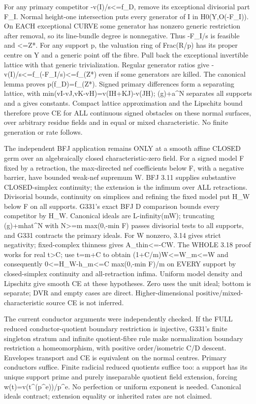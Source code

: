 \documentclass[11pt]{article}
\begin{document}
For any primary competitor -v(I)/s\textless{}=f\_D, remove its exceptional divisorial part F\_I. Normal height-one intersection puts every generator of I in H0(Y,O(-F\_I)). On EACH exceptional CURVE some generator has nonzero generic restriction after removal, so its line-bundle degree is nonnegative. Thus -F\_I/s is feasible and \textless{}=Z*. For any support p, the valuation ring of Frac(R/p) has its proper centre on Y and a generic point off the fibre. Pull back the exceptional invertible lattice with that generic trivialization. Regular generator ratios give -v(I)/s\textless{}=f\_(-F\_I/s)\textless{}=f\_(Z*) even if some generators are killed. The canonical lemma proves p(f\_D)=f\_(Z*). Signed primary differences form a separating lattice, with min(vI-vJ,vK-vH)=v(IH+KJ)-v(JH); (g)+a\textasciicircum{}N separates all supports and a gives constants. Compact lattice approximation and the Lipschitz bound therefore prove CE for ALL continuous signed obstacles on these normal surfaces, over arbitrary residue fields and in equal or mixed characteristic. No finite generation or rate follows.

The independent BFJ application remains ONLY at a smooth affine CLOSED germ over an algebraically closed characteristic-zero field. For a signed model F fixed by a retraction, the max-directed nef coefficients below F, with a negative barrier, have bounded weak-nef supremum W. BFJ 3.11 supplies substantive CLOSED-simplex continuity; the extension is the infimum over ALL retractions. Divisorial bounds, continuity on simplices and refining the fixed model put H\_W below F on all supports. G331's exact BFJ D comparison bounds every competitor by H\_W. Canonical ideals are L-infinity(mW); truncating (g)+mhat\textasciicircum{}N with N\textgreater{}=m max(0,-min F) passes divisorial tests to all supports, and G331 contracts the primary ideals. For W nonzero, 3.14 gives strict negativity; fixed-complex thinness gives A\_thin\textless{}=-CW. The WHOLE 3.18 proof works for real t\textgreater{}C; use t=m+C to obtain (1+C/m)W\textless{}=W\_m\textless{}=W and consequently 0\textless{}=H\_W-h\_m\textless{}=C max(0,-min F)/m on EVERY support by closed-simplex continuity and all-retraction infima. Uniform model density and Lipschitz give smooth CE at these hypotheses. Zero uses the unit ideal; bottom is separate; DVR and empty cases are direct. Higher-dimensional positive/mixed-characteristic source CE is not inferred.

The current conductor arguments were independently checked. If the FULL reduced conductor-quotient boundary restriction is injective, G331's finite singleton stratum and infinite quotient-fibre rule make normalization boundary restriction a homeomorphism, with positive order/isometric C/D descent. Envelopes transport and CE is equivalent on the normal centres. Primary conductors suffice. Finite radicial reduced quotients suffice too: a support has its unique support prime and purely inseparable quotient field extension, forcing w(t)=v(t\textasciicircum{}(p\textasciicircum{}e))/p\textasciicircum{}e. No perfection or uniform exponent is needed. Canonical ideals contract; extension equality or inherited rates are not claimed.
\end{document}
